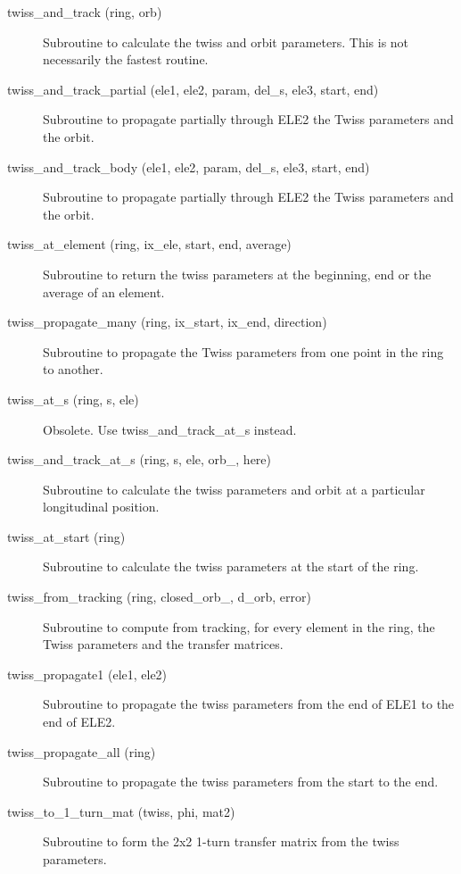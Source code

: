 \begin{description}
\item[twiss\_and\_track (ring, orb)] \Newline
Subroutine to calculate the twiss and orbit parameters. This is not necessarily the fastest routine. 

\item[twiss\_and\_track\_partial (ele1, ele2, param, del\_s, ele3, start, end)] \Newline
Subroutine to propagate partially through ELE2 the Twiss parameters and the orbit. 

\item[twiss\_and\_track\_body (ele1, ele2, param, del\_s, ele3, start, end)] \Newline
Subroutine to propagate partially through ELE2 the Twiss parameters and the orbit. 

\item[twiss\_at\_element (ring, ix\_ele, start, end, average)] \Newline
Subroutine to return the twiss parameters at the beginning, end or the average of an element. 

\item[twiss\_propagate\_many (ring, ix\_start, ix\_end, direction)] \Newline
Subroutine to propagate the Twiss parameters from one point in the ring to another. 

\item[twiss\_at\_s (ring, s, ele)] \Newline
Obsolete. Use twiss\_and\_track\_at\_s instead. 

\item[twiss\_and\_track\_at\_s (ring, s, ele, orb\_, here)] \Newline
Subroutine to calculate the twiss parameters and orbit at a particular longitudinal position. 

\item[twiss\_at\_start (ring)] \Newline
Subroutine to calculate the twiss parameters at the start of the ring. 

\item[twiss\_from\_tracking (ring, closed\_orb\_, d\_orb, error)] \Newline
Subroutine to compute from tracking, for every element in the ring, the Twiss parameters and the transfer matrices. 

\item[twiss\_propagate1 (ele1, ele2)] \Newline
Subroutine to propagate the twiss parameters from the end of ELE1 to the end of ELE2. 

\item[twiss\_propagate\_all (ring)] \Newline
Subroutine to propagate the twiss parameters from the start to the end. 

\item[twiss\_to\_1\_turn\_mat (twiss, phi, mat2)] \Newline
Subroutine to form the 2x2 1-turn transfer matrix from the twiss parameters. 

\end{description}


